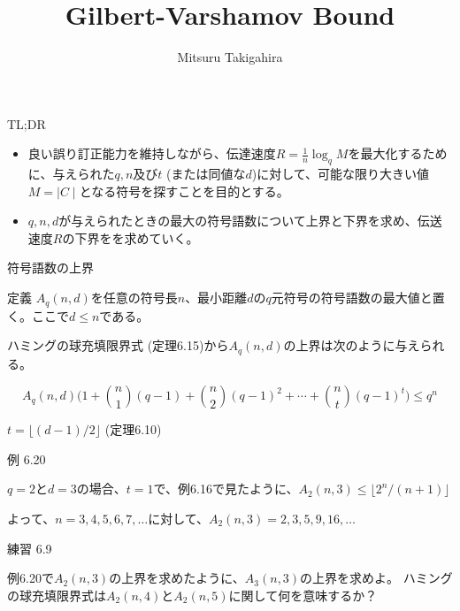 \documentclass[dvipdfmx,10pt,jsarticle]{beamer}
\title{Gilbert-Varshamov Bound}
\author{Mitsuru Takigahira}
\date[2017/09/08]{}
\begin{document}
\frame{\maketitle}
  \begin{frame}{TL;DR}
    \begin{itemize}
      \item 良い誤り訂正能力を維持しながら、伝達速度$R = \frac{1}{n} \log_q M$を最大化するために、与えられた$q, n$及び$t $ (または同値な$d$)に対して、可能な限り大きい値$M = \mid C \mid $となる符号を探すことを目的とする。
      \item $q, n, d$が与えられたときの最大の符号語数について上界と下界を求め、伝送速度$R$の下界をを求めていく。
    \end{itemize}

  \end{frame}
  \begin{frame}{符号語数の上界}
    
    \begin{block}{定義}
      $A_q (n, d)$を任意の符号長$n$、最小距離$d$の$q$元符号の符号語数の最大値と置く。ここで$d \leq n$である。
    \end{block}

    ハミングの球充填限界式 (定理6.15)から$A_q (n, d)$の上界は次のように与えられる。

    \[A_q (n, d) \big(1 + \binom n1 (q - 1) + \binom n2 {(q - 1)}^2 + \cdots + \binom nt {(q - 1)}^t \big) \leq q^n\]

    $t = \lfloor (d - 1) / 2 \rfloor$ (定理6.10)
  \end{frame}

  \begin{frame}{例 6.20}
      
    $q = 2$と$d = 3$の場合、$t = 1$で、例6.16で見たように、$A_2 (n, 3) \leq \lfloor 2^n / (n + 1) \rfloor$

    よって、$n = 3, 4, 5, 6, 7, \dots $に対して、$A_2 (n, 3) = 2, 3, 5, 9, 16, \dots $

    \vspace{1cm}

      \begin{block}{練習 6.9}
        
      例6.20で$A_2 (n, 3)$の上界を求めたように、$A_3(n, 3)$の上界を求めよ。
      ハミングの球充填限界式は$A_2 (n, 4)$と$A_2 (n,5)$に関して何を意味するか？ \\
      \end{block}
  \end{frame}
\end{document}
